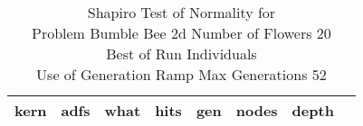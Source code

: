 \begin{table}[H]
\caption{Shapiro Test of Normality for \\ Problem  Bumble Bee 2d  Number of Flowers 20\\Best of Run Individuals \\ Use of Generation Ramp  Max Generations 52\\}
\begin{center}
\scalebox{0.8} %
{
\begin{tabular}{lrrrrrrr}
\hline
kern & adfs & what & hits & gen & nodes & depth \\
\hline


\end{tabular}
}
\end{center}
\end{table}

